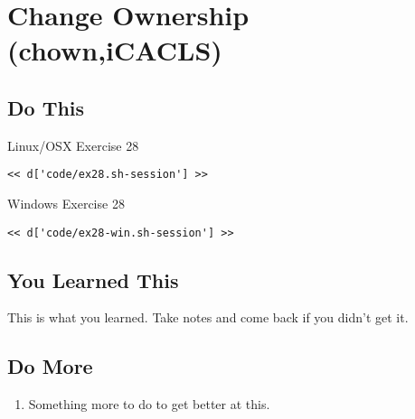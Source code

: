 \chapter{Change Ownership (chown,iCACLS)}

\section{Do This}

\begin{code}{Linux/OSX Exercise 28}
\begin{Verbatim}
<< d['code/ex28.sh-session'] >>
\end{Verbatim}
\end{code}

\begin{code}{Windows Exercise 28}
\begin{Verbatim}
<< d['code/ex28-win.sh-session'] >>
\end{Verbatim}
\end{code}

\section{You Learned This}

This is what you learned.  Take notes and come back if you didn't get it.

\section{Do More}

\begin{enumerate}
\item Something more to do to get better at this.
\end{enumerate}

